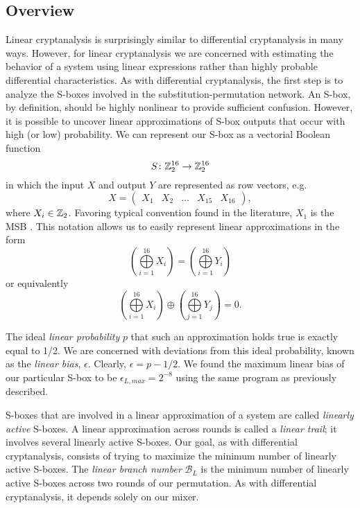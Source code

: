 \subsection{Overview}
Linear cryptanalysis is surprisingly similar to differential cryptanalysis in many ways. 
However, for linear cryptanalysis we are concerned with estimating the behavior of a system using linear expressions rather than highly probable differential characteristics.
As with differential cryptanalysis, the first step is to analyze the S-boxes involved in the substitution-permutation network.
An S-box, by definition, should be highly nonlinear to provide sufficient confusion. 
However, it is possible to uncover linear approximations of S-box outputs that occur with high (or low) probability.
We can represent our S-box as a vectorial Boolean function 
\begin{equation*}
S \colon \mathbb{Z}_2^{16} \rightarrow \mathbb{Z}_2^{16}
\end{equation*}
in which the input $X$ and output $Y$ are represented as row vectors, e.g.\
\begin{equation*}
X = \begin{pmatrix}X_1 & X_2 & ... & X_{15} & X_{16} \end{pmatrix},
\end{equation*}
where $X_i \in \mathbb{Z}_2$.
Favoring typical convention found in the literature, $X_1$ is the MSB \cite{Heys2002_Tutorial}.
This notation allows us to easily represent linear approximations in the form
\begin{equation*}
\left( \bigoplus\limits_{i=1}^{16} X_i \right) = \left( \bigoplus\limits_{i=1}^{16} Y_i \right)
\end{equation*}
or equivalently
\begin{equation*}
\left( \bigoplus\limits_{i=1}^{16} X_i \right) \oplus \left( \bigoplus\limits_{j=1}^{16} Y_j \right) = 0.
\end{equation*}

The ideal \emph{linear probability} $p$ that such an approximation holds true is exactly equal to 1/2.
We are concerned with deviations from this ideal probability, known as the \emph{linear bias}, $\epsilon$. 
Clearly, $\epsilon = p - 1/2$.
We found the maximum linear bias of our particular S-box to be $\epsilon_{L,max} = 2^{-8}$ using the same program as previously described.

S-boxes that are involved in a linear approximation of a system are called \emph{linearly active} S-boxes.
A linear approximation across rounds is called a \emph{linear trail}; it involves several linearly active S-boxes.
Our goal, as with differential cryptanalysis, consists of trying to maximize the minimum number of linearly active S-boxes.
The \emph{linear branch number} $\mathcal{B}_L$ is the minimum number of linearly active S-boxes across two rounds of our permutation.
As with differential cryptanalysis, it depends solely on our mixer.

